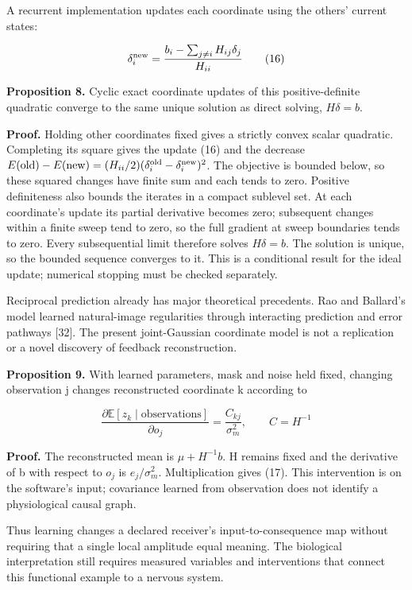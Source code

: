\documentclass[
  american,
  11pt,
  letterpaper,
]{article}
\begin{document}
A recurrent implementation updates each coordinate using the others' current states:

\begin{equation}
\delta_i^{\rm new}=\frac{b_i-\sum_{j\ne i}H_{ij}\delta_j}{H_{ii}}\tag{16}
\end{equation}

\textbf{Proposition 8.} Cyclic exact coordinate updates of this positive-definite quadratic converge to the same unique solution as direct solving, \(H\delta=b\).

\textbf{Proof.} Holding other coordinates fixed gives a strictly convex scalar quadratic. Completing its square gives the update (16) and the decrease \(E(\mathrm{old})-E(\mathrm{new})=(H_{ii}/2)(\delta_i^{\rm old}-\delta_i^{\rm new})^2\). The objective is bounded below, so these squared changes have finite sum and each tends to zero. Positive definiteness also bounds the iterates in a compact sublevel set. At each coordinate's update its partial derivative becomes zero; subsequent changes within a finite sweep tend to zero, so the full gradient at sweep boundaries tends to zero. Every subsequential limit therefore solves \(H\delta=b\). The solution is unique, so the bounded sequence converges to it. This is a conditional result for the ideal update; numerical stopping must be checked separately.

Reciprocal prediction already has major theoretical precedents. Rao and Ballard's model learned natural-image regularities through interacting prediction and error pathways {[}32{]}. The present joint-Gaussian coordinate model is not a replication or a novel discovery of feedback reconstruction.

\textbf{Proposition 9.} With learned parameters, mask and noise held fixed, changing observation j changes reconstructed coordinate k according to

\begin{equation}
\frac{\partial\mathbb E[z_k\mid\text{observations}]}{\partial o_j}=\frac{C_{kj}}{\sigma_m^2},\qquad C=H^{-1}\tag{17}
\end{equation}

\textbf{Proof.} The reconstructed mean is \(\mu+H^{-1}b\). H remains fixed and the derivative of b with respect to \(o_j\) is \(e_j/\sigma_m^2\). Multiplication gives (17). This intervention is on the software's input; covariance learned from observation does not identify a physiological causal graph.

Thus learning changes a declared receiver's input-to-consequence map without requiring that a single local amplitude equal meaning. The biological interpretation still requires measured variables and interventions that connect this functional example to a nervous system.
\end{document}
